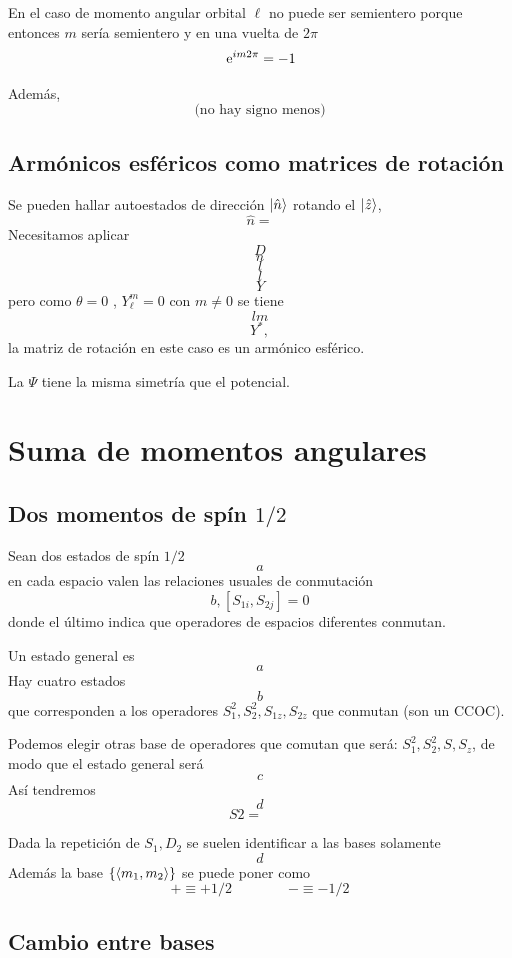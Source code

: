 \documentclass[10pt,oneside]{CBFT_book}
\begin{document}
En el caso de momento angular orbital $\ell$ no puede ser semientero porque entonces $m$ sería semientero y 
en una vuelta de $2\pi$
\[
	\:\mathrm{e}^{im2\pi} = -1
\]	

Además,
\[
	\text{(no hay signo menos)}
\]

\subsection{Armónicos esféricos como matrices de rotación}

Se pueden hallar autoestados de dirección $\Ket{\hat{n}}$ rotando el $\Ket{\hat{z}}$,
\[
	\hat{n} = 
\]
Necesitamos aplicar 
\[
	D
\]
\[
	n
\]
\[
	l
\]
\[
	l
\]
\[
	Y
\]
pero como $\theta=0$ , $Y_\ell^m = 0$  con $m\neq 0$ se tiene 
\[
	lm
\]
\[
	Y^*,
\]
la matriz de rotación en este caso es un armónico esférico.

La $\Psi$ tiene la misma simetría que el potencial.

\section{Suma de momentos angulares}

\subsection{Dos momentos de spín $1/2$}

Sean dos estados de spín $1/2$
\[
	a
\]
en cada espacio valen las relaciones usuales de conmutación 
\[
	b, [S_{1i},S_{2j}] = 0
\]
donde el último indica que operadores de espacios diferentes conmutan.

Un estado general es 
\[
	a
\]
Hay cuatro estados
\[
	b
\]
que corresponden a los operadores $S_ 1^2, S_2^2, S_{1z}, S_{2z}$ que conmutan (son un CCOC).

Podemos elegir otras base de operadores que comutan que será: $S_ 1^2, S_2^2, S, S_{z}$, de modo que el estado general 
será
\[
	c
\]
Así tendremos
\[
	d
\]
\[
	S 2 =  \qquad 
\]

Dada la repetición de $S_1,D_2$ se suelen identificar a las bases solamente 
\[
	d
\]
Además la base $\{ \Braket{m_1,m_2}\}$ se puede poner como 
\[
	+ \equiv + 1/2 \qquad\qquad - \equiv - 1/2
\]

\subsection{Cambio entre bases}
\end{document}
